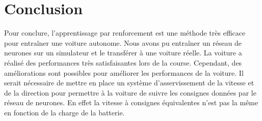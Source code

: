 \documentclass[french]{article}
\begin{document}
    



\section{Conclusion}

Pour conclure, l'apprentissage par renforcement est une méthode très efficace pour entraîner une voiture autonome.
Nous avons pu entraîner un réseau de neurones sur un simulateur et le transférer à une voiture réelle. La voiture
a réalisé des performances très satisfaisantes lors de la course. Cependant, des améliorations sont possibles pour
améliorer les performances de la voiture. Il serait nécessaire de mettre en place un système d'asservissement de 
la vitesse et de la direction pour permettre à la voiture de suivre les consignes données par le réseau de neurones.
En effet la vitesse à consignes équivalentes n'est pas la même en fonction de la charge de la batterie.






\printbibliography
\end{document}
